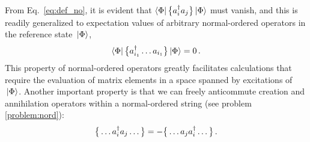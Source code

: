 From Eq.~\eqref{eq:def_no}, it is evident that $\langle{\Phi}|\,{\big\{a^\dag_ia_j\big\}}\,|{\Phi}\rangle$ 
must vanish, and this is readily generalized to expectation values of 
arbitrary normal-ordered operators in the reference state $\,|{\Phi}\rangle$,
\begin{equation}\label{eq:nord_ex}
  \matrixe{\Phi}{\nord{\aaO_{i_1}\ldots\aO_{i_1}}}{\Phi} = 0\,.
\end{equation}
This property of normal-ordered operators greatly facilitates calculations 
that require the evaluation of matrix elements in a space spanned by excitations 
of $\,|{\Phi}\rangle$. Another important property is that we can freely anticommute 
creation and annihilation operators within a normal-ordered string
(see problem \ref{problem:nord}):
\begin{equation}\label{eq:nord_acomm}
  \nord{\ldots\aaO_i\aO_j\ldots} = -\nord{\ldots\aO_j\aaO_i\ldots}\,.
\end{equation}

